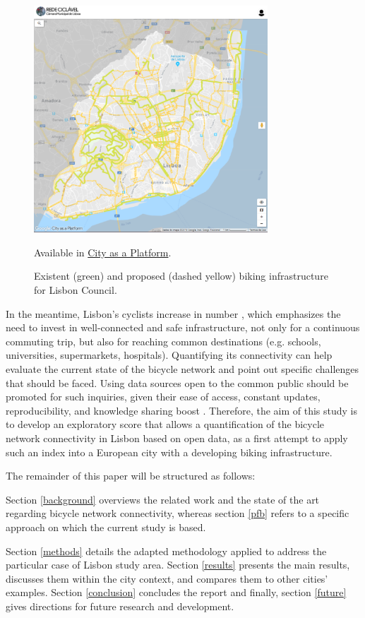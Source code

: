 \documentclass[information,article,submit,moreauthors,pdftex,10pt,a4paper]{mdpi}
\theoremstyle{mdpi}
\newcounter{ex}
\newcounter{re}
\theoremstyle{mdpidefinition}
\begin{document}
\begin{figure}[ht]
	\begin{center}
		\includegraphics[height=8.5cm]{fig1}
		\caption{Existent (green) and proposed (dashed yellow) biking infrastructure for Lisbon Council.} Available in \protect\href{https://lisboa.city-platform.com/app/?a=redeciclavel}{City as a Platform}.
		\label{fig1}
	\end{center}
\end{figure}

In the meantime, Lisbon's cyclists increase in number \cite{Baratto2016}, which emphasizes the need to invest in well-connected and safe infrastructure, not only for a continuous commuting trip, but also for reaching common destinations (e.g. schools, universities, supermarkets, hospitals). Quantifying its connectivity can help evaluate the current state of the bicycle network and point out specific challenges that should be faced. Using data sources open to the common public should be promoted for such inquiries, given their ease of access, constant updates, reproducibility, and knowledge sharing boost \cite{opendatahandbook,EuropeanDataPortal2018}. Therefore, the aim of this study is to develop an exploratory score that allows a quantification of the bicycle network connectivity in Lisbon based on open data, as a first attempt to apply such an index into a European city with a developing biking infrastructure.

The remainder of this paper will be structured as follows: 
\begin{mycolorbox}[colback=yellow]
Section \ref{background} overviews the related work and the state of the art regarding bicycle network connectivity, whereas section \ref{pfb} refers to a specific approach on which the current study is based.
\end{mycolorbox}
Section \ref{methods} details the adapted methodology applied to address the particular case of Lisbon study area. Section \ref{results} presents the main results, discusses them within the city context, and compares them to other cities' examples. Section \ref{conclusion} concludes the report and finally, section \ref{future} gives directions for future research and development.
\end{document}
